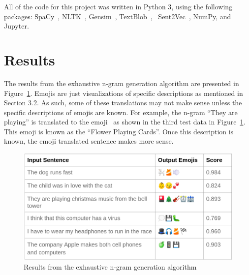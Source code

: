 \documentclass{article}[10]
\newcommand*{\img}[1]{%
  \raisebox{-.3\baselineskip}{%
    \texttt{[image: \#1]}%
  }%
}
\begin{document}
All of the code for this project was written in Python 3, using the
following packages: SpaCy~\cite{spacy2}, NLTK~\cite{bird2009natural},
Gensim~\cite{gensim}, TextBlob~\cite{TextBlob},
~Sent2Vec~\cite{pg2017unsu}, NumPy\cite{numpy}, and
Jupyter\cite{Kluyver:2016aa}.

\section{Results\label{sec:results}}

The results from the exhaustive n-gram generation algorithm are
presented in Figure~\ref{fig:extractive}. Emojis are just
visualizations of specific descriptions as mentioned in Section 3.2. As
such, some of these translations may not make sense unless the specific
descriptions of emojis are known. For example, the n-gram ``They are
playing'' is translated to the emoji~\img{emojis/1f3b4.png} as shown in the third
test data in Figure~\ref{fig:extractive}. This emoji is known
as the ``Flower Playing Cards''. Once this description is known, the
emoji translated sentence makes more sense.

\begin{figure}[H]
  \begin{center}
    \includegraphics[width=0.70\columnwidth]{figures/extractive.png}
    \caption{Results from the exhaustive n-gram generation algorithm\label{fig:extractive}}
  \end{center}
\end{figure}
\end{document}

